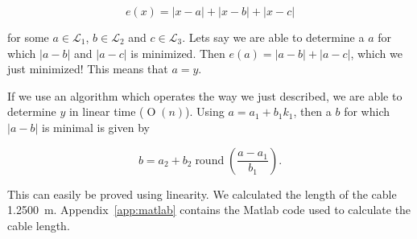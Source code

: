 \documentclass[11pt,titlepage]{report}
\begin{document}
\begin{equation}
	e(x) = |x-a|+|x-b|+|x-c|
\end{equation}

for some $a \in \mathcal{L}_1$, $b \in \mathcal{L}_2$ and $c \in \mathcal{L}_3$. Lets say we are able to determine a $a$ for which $|a-b|$ and $|a-c|$ is minimized. Then $e(a)=|a-b|+|a-c|$, which we just minimized! This means that $a=y$.

If we use an algorithm which operates the way we just described, we are able to determine $y$ in linear time ($\operatorname{O}(n)$). Using $a = a_1 + b_1 k_1$, then a $b$ for which $|a-b|$ is minimal is given by

\begin{equation}
	b=a_2+b_2 \operatorname{round}\left(\frac{a-a_1}{b_1}\right).
\end{equation}

This can easily be proved using linearity. We calculated the length of the cable \SI{1.2500}{m}. Appendix~\ref{app:matlab} contains the Matlab code used to calculate the cable length.

\end{document}
